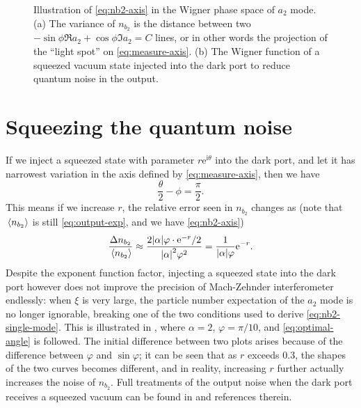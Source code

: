 \documentclass[hyperref, a4paper]{article}
\newcommand*{\ii}{\mathrm{i}}
\newcommand*{\ee}{\mathrm{e}}
\begin{document}
\begin{figure}
    \centering
    \begin{subfigure}{0.48\textwidth}
        \centering
        
        \subcaption{}
    \end{subfigure}
    \begin{subfigure}{0.48\textwidth}
        \centering
        
        \subcaption{}
    \end{subfigure}
    \caption{Illustration of \eqref{eq:nb2-axis} in the Wigner phase space of $a_2$ mode. 
    (a) The variance of $n_{b_2}$ is the distance 
    between two $-\sin \phi \Re a_2 + \cos \phi \Im a_2 = C$ lines,
    or in other words the projection of the ``light spot'' on \eqref{eq:measure-axis}.
    (b) The Wigner function of a squeezed vacuum state injected into the dark port 
    to reduce quantum noise in the output.
    }
    \label{fig:can-be-squeezed}
\end{figure}

\section{Squeezing the quantum noise}\label{sec:squeezing}

If we inject a squeezed state with parameter $r \ee^{\ii \theta}$ 
into the dark port,
and let it has narrowest variation in the axis defined by \eqref{eq:measure-axis}, 
then we have 
\begin{equation}
    \frac{\theta}{2} - \phi = \frac{\pi}{2}.
    \label{eq:optimal-angle}
\end{equation}
This means if we increase $r$, 
the relative error seen in $n_{b_2}$ changes as 
(note that $\expval*{n_{b_2}}$ is still \eqref{eq:output-exp},
and we have \eqref{eq:nb2-axis})
\begin{equation}
    \frac{\Delta n_{b_2}}{\expval*{n_{b_2}}} 
    \approx \frac{2 \abs{\alpha} \varphi \cdot \ee^{-r} /2 }{\abs{\alpha}^2 \varphi^2} 
    = \frac{1}{\abs{\alpha} \varphi} \ee^{-r}.
    \label{eq:approx-squeezing}
\end{equation}
Despite the exponent function factor,
injecting a squeezed state into the dark port however does not improve 
the precision of Mach-Zehnder interferometer endlessly:
when $\xi$ is very large,
the particle number expectation of the $a_2$ mode is no longer ignorable,
breaking one of the two conditions used to derive \eqref{eq:nb2-single-mode}.
This is illustrated in ,
where $\alpha = 2$, $\varphi = \pi / 10$,
and \eqref{eq:optimal-angle} is followed.
The initial difference between two plots arises because of the difference between $\varphi$ and $\sin \varphi$;
it can be seen that as $r$ exceeds 0.3,
the shapes of the two curves becomes different,
and in reality, increasing $r$ further actually increases the noise of $n_{b_2}$.
Full treatments of the output noise when the dark port receives a squeezed vacuum
can be found in \cite{walls_quantum_2008,pezze_mach-zehnder_2008} and references therein.
\end{document}
